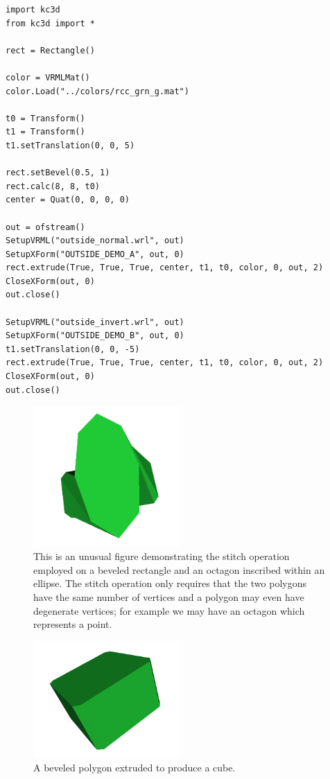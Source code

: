 \begin{verbatim}
import kc3d
from kc3d import *

rect = Rectangle()

color = VRMLMat()
color.Load("../colors/rcc_grn_g.mat")

t0 = Transform()
t1 = Transform()
t1.setTranslation(0, 0, 5)

rect.setBevel(0.5, 1)
rect.calc(8, 8, t0)
center = Quat(0, 0, 0, 0)

out = ofstream()
SetupVRML("outside_normal.wrl", out)
SetupXForm("OUTSIDE_DEMO_A", out, 0)
rect.extrude(True, True, True, center, t1, t0, color, 0, out, 2)
CloseXForm(out, 0)
out.close()

SetupVRML("outside_invert.wrl", out)
SetupXForm("OUTSIDE_DEMO_B", out, 0)
t1.setTranslation(0, 0, -5)
rect.extrude(True, True, True, center, t1, t0, color, 0, out, 2)
CloseXForm(out, 0)
out.close()
\end{verbatim}

\begin{figure}
\label{fig:k3dtools-weird}
\centering
\includegraphics[width = 0.5\textwidth]{img/k3dtools-weird.png}
\caption{This is an unusual figure demonstrating the stitch operation employed on a
beveled rectangle and an octagon inscribed within an ellipse. The stitch operation
only requires that the two polygons have the same number of vertices and a polygon may
even have degenerate vertices; for example we may have an octagon which represents a point.}
\end{figure}

\begin{figure}
\label{fig:k3dtools-extrude}
\centering
\includegraphics[width = 0.5\textwidth]{img/k3dtools-extrude.png}
\caption{A beveled polygon extruded to produce a cube.}
\end{figure}


